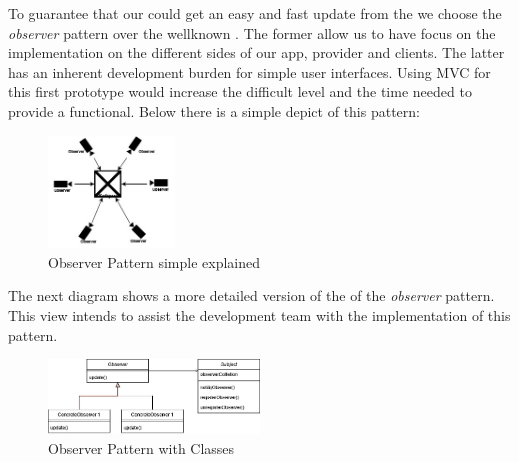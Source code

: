 To guarantee that our  could get an easy and fast update from the  we choose 
the \textit{observer} pattern over the wellknown . The former allow us to have focus on the implementation
on the different sides of our app, provider and clients. The latter has an inherent development burden for simple user
interfaces. Using \gls{MVC} for this first prototype would increase the difficult level and the time needed to provide a 
functional. Below there is a simple depict of this pattern:
\begin{figure}[H]
    \centering
    \includegraphics[width=0.3\textwidth]{assets/observer.jpg}
    \caption{Observer Pattern simple explained}
    \label{fig:simple_observer}
\end{figure}

The next diagram shows a more detailed version of the of the \textit{observer} pattern. This view intends to assist the development
team with the implementation of this pattern.

\begin{figure}[H]
    \centering
    \includegraphics[width=0.5\textwidth]{assets/class_observer.jpg}
    \caption{Observer Pattern with Classes}
    \label{fig:class_observer}
\end{figure}

